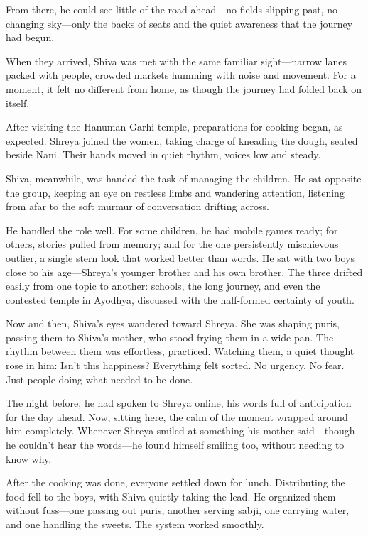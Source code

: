 From there, he could see little of the road ahead—no fields slipping past, no changing sky—only the backs of seats and the quiet awareness that the journey had begun.

When they arrived, Shiva was met with the same familiar sight—narrow lanes packed with people, crowded markets humming with noise and movement. For a moment, it felt no different from home, as though the journey had folded back on itself.

After visiting the Hanuman Garhi temple, preparations for cooking began, as expected. Shreya joined the women, taking charge of kneading the dough, seated beside Nani. Their hands moved in quiet rhythm, voices low and steady.

Shiva, meanwhile, was handed the task of managing the children. He sat opposite the group, keeping an eye on restless limbs and wandering attention, listening from afar to the soft murmur of conversation drifting across.

He handled the role well. For some children, he had mobile games ready; for others, stories pulled from memory; and for the one persistently mischievous outlier, a single stern look that worked better than words. He sat with two boys close to his age—Shreya's younger brother and his own brother. The three drifted easily from one topic to another: schools, the long journey, and even the contested temple in Ayodhya, discussed with the half-formed certainty of youth.

Now and then, Shiva's eyes wandered toward Shreya. She was shaping puris, passing them to Shiva's mother, who stood frying them in a wide pan. The rhythm between them was effortless, practiced. Watching them, a quiet thought rose in him: Isn't this happiness? Everything felt sorted. No urgency. No fear. Just people doing what needed to be done.

The night before, he had spoken to Shreya online, his words full of anticipation for the day ahead. Now, sitting here, the calm of the moment wrapped around him completely. Whenever Shreya smiled at something his mother said—though he couldn't hear the words—he found himself smiling too, without needing to know why.

After the cooking was done, everyone settled down for lunch. Distributing the food fell to the boys, with Shiva quietly taking the lead. He organized them without fuss—one passing out puris, another serving sabji, one carrying water, and one handling the sweets. The system worked smoothly.

